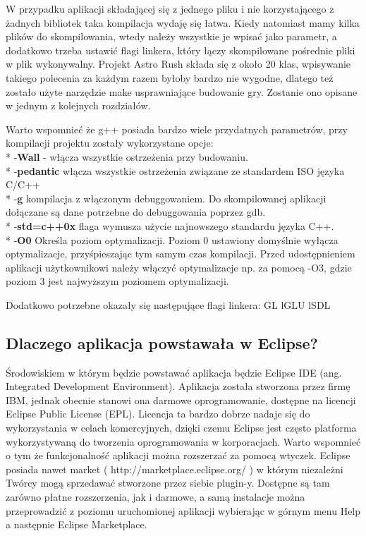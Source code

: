 W przypadku aplikacji składającej się z jednego pliku i nie korzystającego z żadnych bibliotek taka kompilacja wydaję się łatwa.
Kiedy natomiast mamy kilka plików do skompilowania, wtedy należy wszystkie je wpisać jako parametr, a dodatkowo trzeba ustawić 
flagi linkera, który łączy skompilowane pośrednie pliki w plik wykonywalny.
Projekt Astro Rush składa się z około 20 klas, wpisywanie takiego polecenia za każdym razem byłoby bardzo nie wygodne, dlatego też zostało użyte narzędzie make usprawniające budowanie gry. Zostanie ono opisane w jednym z kolejnych rozdziałów. 

Warto wspomnieć że g++ posiada bardzo wiele przydatnych parametrów, przy kompilacji projektu zostały wykorzystane opcje: \\*
-\textbf{Wall} - włącza wszystkie ostrzeżenia przy budowaniu. \\*
-\textbf{pedantic} włącza wszystkie ostrzeżenia związane ze standardem ISO języka C/C++ \\*
-\textbf{g} kompilacja z włączonym debuggowaniem. Do skompilowanej aplikacji dołączane są dane potrzebne do debuggowania poprzez gdb. \\*
-\textbf{std=c++0x} flaga wymusza użycie najnowszego standardu języka C++. \\*
-\textbf{O0} Określa poziom optymalizacji. Poziom 0 ustawiony domyślnie wyłącza optymalizacje, przyśpieszając tym samym czas kompilacji. Przed udostępnieniem aplikacji użytkownikowi należy włączyć optymalizacje np. za pomocą -O3, gdzie poziom 3 jest najwyższym poziomem optymalizacji.  

Dodatkowo potrzebne okazały się następujące flagi linkera:
\-GL \-lGLU \-lSDL 



\subsection{Dlaczego aplikacja powstawała w Eclipse?}
\hspace{1cm} Środowiskiem w którym będzie powstawać aplikacja będzie Eclipse IDE (ang. Integrated Development Environment). Aplikacja została stworzona przez firmę IBM, jednak obecnie stanowi ona darmowe oprogramowanie, dostępne na licencji Eclipse Public License (EPL). Licencja ta bardzo dobrze nadaje się do wykorzystania w celach komercyjnych, dzięki czemu Eclipse jest często platforma wykorzystywaną do tworzenia oprogramowania w korporacjach. Warto wspomnieć o tym że funkcjonalność aplikacji można rozszerzać za pomocą wtyczek. Eclipse posiada nawet market ( http://marketplace.eclipse.org/ ) w którym niezależni Twórcy mogą sprzedawać stworzone przez siebie plugin-y.
Dostępne są tam zarówno płatne rozszerzenia, jak i darmowe, a samą instalacje można przeprowadzić z poziomu uruchomionej aplikacji wybierając w górnym menu Help a następnie Eclipse Marketplace.


